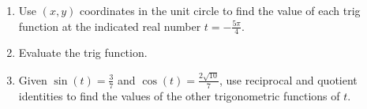 \begin{enumerate}
\vfill

\newpage

\item Use $(x,y)$ coordinates in the unit circle to find the value of each trig function at the indicated real number $t=-\frac{5\pi}{4}$.
\begin{enumerate}
\end{enumerate}


\vfill
\item Evaluate the trig function.
\begin{enumerate}
\end{enumerate}

\vfill

\newpage

\item Given $\sin(t)=\frac{3}{7}$ and $\cos(t)=\frac{2\sqrt{10}}{7}$, use reciprocal and quotient identities to find the values of the other trigonometric functions of $t$.\vfill


\end{enumerate}
